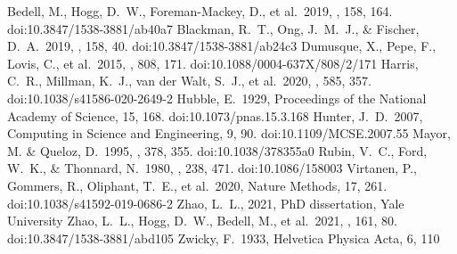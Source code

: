 \documentclass[modern]{aastex631}
\begin{document}
\begin{thebibliography}{dummy}
   Bedell, M., Hogg, D.~W., Foreman-Mackey, D., et al.\ 2019, \aj, 158, 164. doi:10.3847/1538-3881/ab40a7
   Blackman, R.~T., Ong, J.~M.~J., \& Fischer, D.~A.\ 2019, \aj, 158, 40. doi:10.3847/1538-3881/ab24c3
   Dumusque, X., Pepe, F., Lovis, C., et al.\ 2015, \apj, 808, 171. doi:10.1088/0004-637X/808/2/171
   Harris, C.~R., Millman, K.~J., van der Walt, S.~J., et al.\ 2020, \nat, 585, 357. doi:10.1038/s41586-020-2649-2
   Hubble, E.\ 1929, Proceedings of the National Academy of Science, 15, 168. doi:10.1073/pnas.15.3.168
   Hunter, J.~D.\ 2007, Computing in Science and Engineering, 9, 90. doi:10.1109/MCSE.2007.55
   Mayor, M. \& Queloz, D.\ 1995, \nat, 378, 355. doi:10.1038/378355a0
   Rubin, V.~C., Ford, W.~K., \& Thonnard, N.\ 1980, \apj, 238, 471. doi:10.1086/158003
   Virtanen, P., Gommers, R., Oliphant, T.~E., et al.\ 2020, Nature Methods, 17, 261. doi:10.1038/s41592-019-0686-2
   Zhao, L.~L., 2021, PhD dissertation, Yale University
   Zhao, L.~L., Hogg, D.~W., Bedell, M., et al.\ 2021, \aj, 161, 80. doi:10.3847/1538-3881/abd105
   Zwicky, F.\ 1933, Helvetica Physica Acta, 6, 110
\end{thebibliography}
\end{document}

